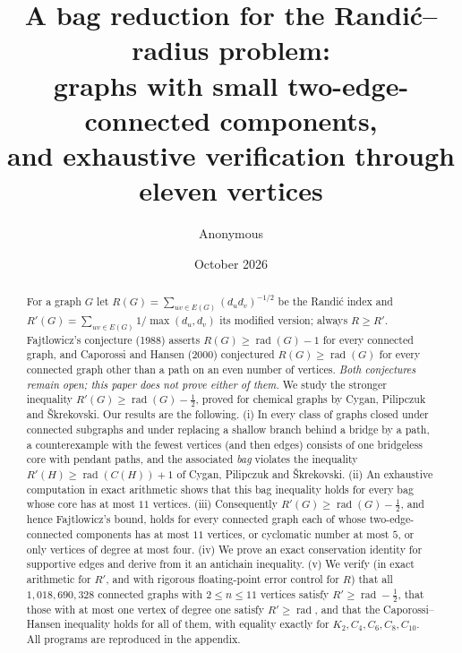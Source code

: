 \documentclass[11pt]{amsart}
\theoremstyle{definition}
\DeclareMathOperator{\rad}{rad}
\newcommand{\Rp}{R'}
\newcommand{\kmax}{11}
\newcommand{\mumax}{5}
\begin{document}
\title[A bag reduction for the Randi\'c--radius problem]{A bag reduction for the Randi\'c--radius problem:\\
graphs with small two-edge-connected components,\\ and exhaustive verification through eleven vertices}

\author{Anonymous}
\date{October 2026}

\begin{abstract}
For a graph $G$ let $R(G)=\sum_{uv\in E(G)}(d_ud_v)^{-1/2}$ be the Randi\'c index and
$\Rp(G)=\sum_{uv\in E(G)}1/\max(d_u,d_v)$ its modified version; always $R\ge \Rp$.
Fajtlowicz's conjecture (1988) asserts $R(G)\ge\rad(G)-1$ for every connected graph, and
Caporossi and Hansen (2000) conjectured $R(G)\ge\rad(G)$ for every connected graph other than a path on an
even number of vertices. \emph{Both conjectures remain open; this paper does not prove either of them.}
We study the stronger inequality $\Rp(G)\ge\rad(G)-\tfrac12$, proved for chemical graphs by Cygan,
Pilipczuk and \v{S}krekovski. Our results are the following.
(i) In every class of graphs closed under connected subgraphs and under replacing a shallow branch behind a
bridge by a path, a counterexample with the fewest vertices (and then edges) consists of one bridgeless core with pendant paths,
and the associated \emph{bag} violates the inequality $\Rp(H)\ge\rad(C(H))+1$ of Cygan, Pilipczuk and \v{S}krekovski.
(ii) An exhaustive computation in exact arithmetic shows that this bag inequality holds for every bag whose core
has at most $\kmax$ vertices.
(iii) Consequently $\Rp(G)\ge\rad(G)-\tfrac12$, and hence Fajtlowicz's bound, holds for every connected graph
each of whose two-edge-connected components has at most $\kmax$ vertices, or cyclomatic number at most $\mumax$, or only vertices of degree at most four.
(iv) We prove an exact conservation identity for supportive edges and derive from it an antichain inequality.
(v) We verify (in exact arithmetic for $\Rp$, and with rigorous floating-point error control for $R$) that all
$1{,}018{,}690{,}328$ connected graphs with $2\le n\le 11$ vertices satisfy
$\Rp\ge\rad-\tfrac12$, that those with at most one vertex of degree one satisfy $\Rp\ge\rad$, and that the
Caporossi--Hansen inequality holds for all of them, with equality exactly for $K_2,C_4,C_6,C_8,C_{10}$.
All programs are reproduced in the appendix.
\end{abstract}

\maketitle
\end{document}
